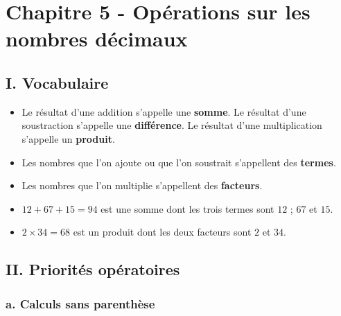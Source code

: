 \section*{Chapitre 5 - Opérations sur les nombres décimaux}

\subsection*{I. Vocabulaire}

\begin{Définition*}[c]
\leavevmode\vspace{-\baselineskip}
\begin{itemize}[label=\textcolor{Couleur6}{$\bullet$}]
\item Le résultat d'une addition s'appelle une \textbf{somme}. Le résultat d'une soustraction s'appelle une \textbf{différence}. Le résultat d'une multiplication s'appelle un \textbf{produit}.
\item Les nombres que l'on ajoute ou que l'on soustrait s'appellent des \textbf{termes}.
\item Les nombres que l'on multiplie s'appellent des \textbf{facteurs}.
\end{itemize}
\end{Définition*}

\begin{Exemples}
\begin{itemize}[label=\textcolor{Couleur8}{$\bullet$}]
\item $12 + 67 + 15 = 94$ est une somme dont les trois termes sont $12$ ; $67$ et $15$.
\item $2 \times 34 = 68$ est un produit dont les deux facteurs sont $2$ et $34$.
\end{itemize}
\end{Exemples}

\subsection*{II. Priorités opératoires}
\subsubsection*{a. Calculs sans parenthèse}

